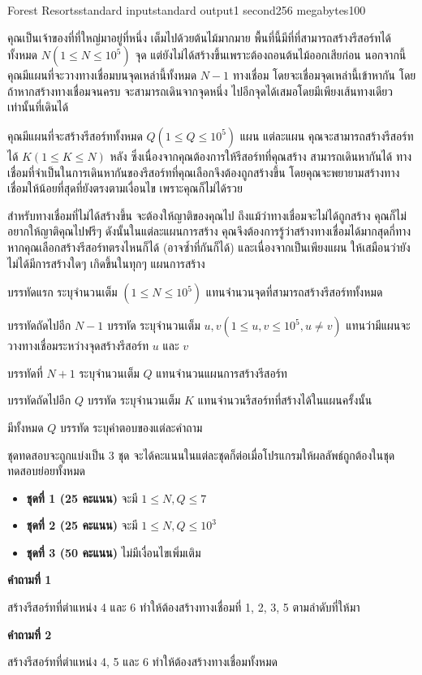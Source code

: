 \documentclass[11pt,a4paper]{article}
\begin{document}
\begin{problem}{Forest Resorts}{standard input}{standard output}{1 second}{256 megabytes}{100}

คุณเป็นเจ้าของที่ที่ใหญ่มาอยู่ที่หนึ่ง เต็มไปด้วยต้นไม้มากมาย พื้นที่นี้มีที่ที่สามารถสร้างรีสอร์ทได้ทั้งหมด $N (1 \leq N \leq 10^5)$ จุด แต่ยังไม่ได้สร้างขึ้นเพราะต้องถอนต้นไม้ออกเสียก่อน นอกจากนี้ คุณมีแผนที่จะวางทางเชื่อมบนจุดเหล่านี้ทั้งหมด $N - 1$ ทางเชื่อม โดยจะเชื่อมจุดเหล่านี้เข้าหากัน โดยถ้าหากสร้างทางเชื่อมจนครบ จะสามารถเดินจากจุดหนึ่ง ไปอีกจุดได้เสมอโดยมีเพียงเส้นทางเดียวเท่านั้นที่เดินได้

คุณมีแผนที่จะสร้างรีสอร์ททั้งหมด $Q (1 \leq Q \leq 10^5)$ แผน แต่ละแผน คุณจะสามารถสร้างรีสอร์ทได้ $K (1 \leq K \leq N)$ หลัง ซึ่งเนื่องจากคุณต้องการให้รีสอร์ทที่คุณสร้าง สามารถเดินหากันได้ ทางเชื่อมที่จำเป็นในการเดินหากันของรีสอร์ทที่คุณเลือกจึงต้องถูกสร้างขึ้น โดยคุณจะพยายามสร้างทางเชื่อมให้น้อยที่สุดที่ยังตรงตามเงื่อนไข เพราะคุณก็ไม่ได้รวย

สำหรับทางเชื่อมที่ไม่ได้สร้างขึ้น จะต้องให้ญาติของคุณไป ถึงแม้ว่าทางเชื่อมจะไม่ได้ถูกสร้าง คุณก็ไม่อยากให้ญาติคุณไปฟรีๆ ดังนั้นในแต่ละแผนการสร้าง คุณจึงต้องการรู้ว่าสร้างทางเชื่อมได้มากสุดกี่ทาง หากคุณเลือกสร้างรีสอร์ทตรงไหนก็ได้ (อาจซ้ำที่กันก็ได้) และเนื่องจากเป็นเพียงแผน ให้เสมือนว่ายังไม่ได้มีการสร้างใดๆ เกิดขึ้นในทุกๆ แผนการสร้าง

\InputFile
บรรทัดแรก ระบุจำนวนเต็ม $(1 \leq N \leq 10^5)$ แทนจำนวนจุดที่สามารถสร้างรีสอร์ททั้งหมด

บรรทัดถัดไปอีก $N - 1$ บรรทัด ระบุจำนวนเต็ม $u, v (1 \leq u, v \leq 10^5, u \neq v)$ แทนว่ามีแผนจะวางทางเชื่อมระหว่างจุดสร้างรีสอร์ท $u$ และ $v$

บรรทัดที่ $N + 1$ ระบุจำนวนเต็ม $Q$ แทนจำนวนแผนการสร้างรีสอร์ท

บรรทัดถัดไปอีก $Q$ บรรทัด ระบุจำนวนเต็ม $K$ แทนจำนวนรีสอร์ทที่สร้างได้ในแผนครั้งนั้น

\OutputFile
มีทั้งหมด $Q$ บรรทัด ระบุคำตอบของแต่ละคำถาม

\Scoring
ชุดทดสอบจะถูกแบ่งเป็น 3 ชุด จะได้คะแนนในแต่ละชุดก็ต่อเมื่อโปรแกรมให้ผลลัพธ์ถูกต้องในชุดทดสอบย่อยทั้งหมด

\begin{itemize}
\item \textbf{ชุดที่ 1 (25 คะแนน)} จะมี $1 \leq N, Q\leq 7$

\item \textbf{ชุดที่ 2 (25 คะแนน)} จะมี $1 \leq N, Q\leq 10^3$

\item \textbf{ชุดที่ 3 (50 คะแนน)} ไม่มีเงื่อนไขเพิ่มเติม
\end{itemize}

\Example

\begin{example}
%
\end{example}

\Note
\textbf{คำถามที่ 1}

สร้างรีสอร์ทที่ตำแหน่ง 4 และ 6 ทำให้ต้องสร้างทางเชื่อมที่ 1, 2, 3, 5 ตามลำดับที่ให้มา

\textbf{คำถามที่ 2}

สร้างรีสอร์ทที่ตำแหน่ง 4, 5 และ 6 ทำให้ต้องสร้างทางเชื่อมทั้งหมด

\end{problem}
\end{document}
